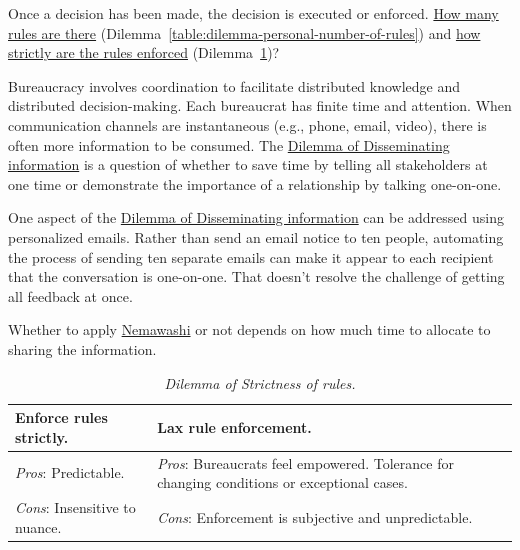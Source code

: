 Once a decision has been made, the decision is executed or enforced. \hyperref[table:dilemma-personal-number-of-rules]{How many rules are there} (Dilemma~\ref{table:dilemma-personal-number-of-rules}) and
\hyperref[table:dilemma-personal-rule-strictness-lax]{how strictly are the rules enforced} (Dilemma~\ref{table:dilemma-personal-rule-strictness-lax})?

Bureaucracy involves coordination to facilitate distributed knowledge and distributed decision-making. Each bureaucrat has finite time and attention. When communication channels are instantaneous (e.g., phone, email, video), there is often more information to be consumed.
The \hyperref[table:dilemma-personal-disseminate-one-by-one]{Dilemma of Disseminating information} is a question of whether to save time by telling all stakeholders at one time or demonstrate the importance of a relationship by talking one-on-one. 


One aspect of the \hyperref[table:dilemma-personal-disseminate-one-by-one]{Dilemma of Disseminating information} can be addressed using personalized emails. Rather than send an email notice to ten people, automating the process of sending ten separate emails can make it appear to each recipient that the conversation is one-on-one.  That doesn't resolve the challenge of getting all feedback at once.

Whether to apply \href{https://en.wikipedia.org/wiki/Nemawashi}{Nemawashi} 
\iftoggle{WPinmargin}{\marginpar{[Wikipedia] Nemawashi}}{}
or not depends on how much time to allocate to sharing the information. 

\begin{center}
\begin{table}[H] %
\begin{tabular}{ | m{\dilemmatablewidth}| m{\dilemmatablewidth} | } 
  \hline
  \textbf{Enforce rules strictly.} & 
  \textbf{Lax rule enforcement.} \\ 
  \hline
  \textit{Pros}: Predictable. &
  \textit{Pros}: Bureaucrats feel empowered. Tolerance for changing conditions or exceptional cases. \\
  \hline
  \textit{Cons}: Insensitive to nuance. & 
  \textit{Cons}: Enforcement is subjective and unpredictable.  \\  
  \hline
\end{tabular}
\caption{
\textit{Dilemma of Strictness of rules.}
}
\label{table:dilemma-personal-rule-strictness-lax}
\end{table}
\end{center}

